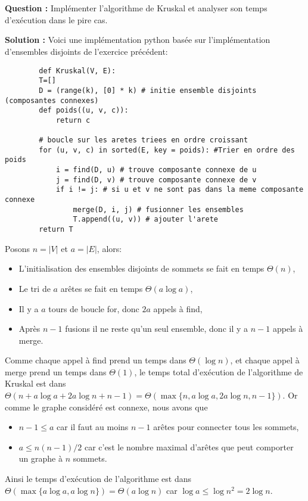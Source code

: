 \documentclass[11pt]{article} %
\newenvironment{question}[1][\unskip]{%
	\par
	\noindent
	\textbf{Question #1:}
	\noindent}
{\medskip}
\newenvironment{solution}[1][\unskip]{%
	\par
	\noindent
	\textbf{Solution #1:}
	\noindent}
{\medskip}
\begin{document}
	\section{}
	\begin{question}
		Implémenter l'algorithme de Kruskal et analyser son temps d'exécution dans le pire cas.
	\end{question}
	\begin{solution}
		Voici une implémentation python basée sur l'implémentation d'ensembles disjoints de l'exercice précédent:
		\begin{lstlisting}
		def Kruskal(V, E):
		T=[]			
		D = (range(k), [0] * k) # initie ensemble disjoints (composantes connexes)	
		def poids((u, v, c)):
			return c
		
		# boucle sur les aretes triees en ordre croissant
		for (u, v, c) in sorted(E, key = poids): #Trier en ordre des poids
			i = find(D, u) # trouve composante connexe de u
			j = find(D, v) # trouve composante connexe de v
			if i != j: # si u et v ne sont pas dans la meme composante connexe
				merge(D, i, j) # fusionner les ensembles
				T.append((u, v)) # ajouter l'arete
		return T		
		\end{lstlisting}
		Posons $n=|V|$ et $a=|E|$, alors:
		\begin{itemize}
			\item {L'initialisation des ensembles disjoints de sommets se fait en temps $\Theta(n)$,}
			\item {Le tri de $a$ arêtes se fait en temps $\Theta(a \log a)$,}
			\item {Il y a $a$ tours de boucle for, donc $2a$ appels à find,}
			\item {Après $n-1$ fusions il ne reste qu'un seul ensemble, donc il y a $n-1$ appels à merge.}
		\end{itemize}
		Comme chaque appel à find prend un temps dans $\Theta(\log n)$, et chaque appel à merge prend un temps dans $\Theta(1)$, le temps total d'exécution de l'algorithme de Kruskal est dans $\Theta(n + a\log a + 2a \log n + n-1)=\Theta(\max\{n,a \log a, 2a \log n, n-1\})$. Or comme le graphe considéré est connexe, nous avons que 
		\begin{itemize}
			\item {$n-1 \leq a$ car il faut au moins $n-1$ arêtes pour connecter tous les sommets,}
			\item {$a \leq n(n-1)/2$ car c'est le nombre maximal d'arêtes que peut comporter un graphe à $n$ sommets.}
		\end{itemize}
		Ainsi le temps d'exécution de l'algorithme est dans $\Theta(\max\{a \log a, a \log n\})=\Theta(a \log n)$ car $\log a \leq \log n^2 = 2 \log n$.
	\end{solution}
	
\end{document}
